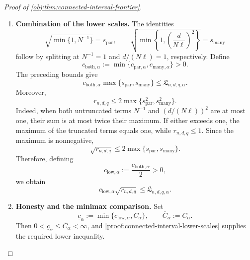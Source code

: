 \begin{proof}[Proof of \cref{obj:thm:connected-interval-frontier}]
\begin{enumerate}
Finally, if \(N<T_{\mathrm{act},\alpha}\), monotonicity of the square
root and reciprocal gives
\[
\min\{1,T_{\mathrm{act},\alpha}^{-1/2}\}
\le s_{\mathrm{par}}.
\]
Using \(s_{\mathrm{many}}\le1\), we obtain
\[
c_{\mathrm{many},\alpha}s_{\mathrm{many}}
\le c_{\mathrm{many},\alpha}
\le
c_{\mathrm{par},\alpha}
\min\{1,T_{\mathrm{act},\alpha}^{-1/2}\}
\le\mathfrak L_{n,d,q,\alpha}.
\]

\item \label{proof:connected-interval-lower-scales}\textbf{Combination of the lower scales.}
The identities
\[
\sqrt{\min\{1,N^{-1}\}}=s_{\mathrm{par}},
\qquad
\sqrt{\min\left\{1,\left(\frac{d}{N\ell}\right)^2\right\}}
=s_{\mathrm{many}}
\]
follow by splitting at \(N^{-1}=1\) and \(d/(N\ell)=1\), respectively.
Define
\[
c_{\mathrm{both},\alpha}
:=\min\{c_{\mathrm{par},\alpha},c_{\mathrm{many},\alpha}\}>0.
\]
The preceding bounds give
\[
c_{\mathrm{both},\alpha}
\max\{s_{\mathrm{par}},s_{\mathrm{many}}\}
\le\mathfrak L_{n,d,q,\alpha}.
\]
Moreover,
\[
r_{n,d,q}
\le2\max\{s_{\mathrm{par}}^2,s_{\mathrm{many}}^2\}.
\]
Indeed, when both untruncated terms \(N^{-1}\) and
\((d/(N\ell))^2\) are at most one, their sum is at most twice their
maximum. If either exceeds one, the maximum of the truncated terms
equals one, while \(r_{n,d,q}\le1\). Since the maximum is nonnegative,
\[
\sqrt{r_{n,d,q}}
\le2\max\{s_{\mathrm{par}},s_{\mathrm{many}}\}.
\]
Therefore, defining
\[
c_{\mathrm{low},\alpha}:=\frac{c_{\mathrm{both},\alpha}}2>0,
\]
we obtain
\[
c_{\mathrm{low},\alpha}\sqrt{r_{n,d,q}}
\le\mathfrak L_{n,d,q,\alpha}.
\]

\item \textbf{Honesty and the minimax comparison.}
Set
\[
\underline c_\alpha
:=\min\{c_{\mathrm{low},\alpha},C_\alpha\},
\qquad
\overline C_\alpha:=C_\alpha.
\]
Then \(0<\underline c_\alpha\le\overline C_\alpha<\infty\), and
\cref{proof:connected-interval-lower-scales} supplies the required lower inequality.


\end{enumerate}
\end{proof}
